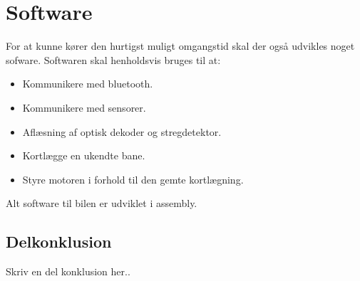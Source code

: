\newpage
\section{Software}
For at kunne kører den hurtigst muligt omgangstid skal der også udvikles noget sofware. Softwaren skal henholdsvis bruges til at:
\begin{itemize}
\item Kommunikere med bluetooth.
\item Kommunikere med sensorer.
\item Aflæsning af optisk dekoder og stregdetektor.
\item Kortlægge en ukendte bane.
\item Styre motoren i forhold til den gemte kortlægning.
\end{itemize}
Alt software til bilen er udviklet i assembly.











\subsection{Delkonklusion}
Skriv en del konklusion her..

